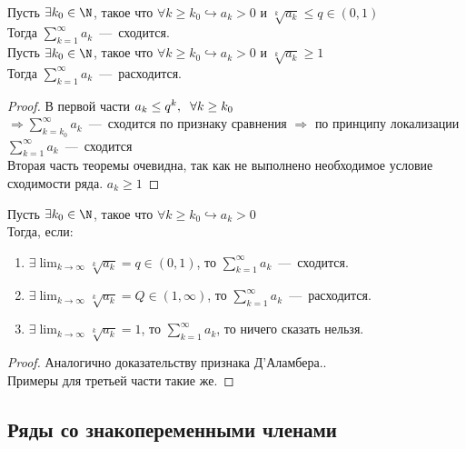 \begin{theorem} 
    \text{}\\ Пусть $\exists k_0 \in \N$, такое что $\forall k \geq k_0 \hookrightarrow a_k > 0 \text{ и } \sqrt[k]{a_k} \leq q \in (0, 1) $\\ 
    Тогда $\sum_{k = 1}^{\infty} a_k$~---~сходится. \\
    Пусть $\exists k_0 \in \N$, такое что $\forall k \geq k_0 \hookrightarrow a_k > 0 \text{ и } \sqrt[k]{a_k} \geq 1 $\\ 
    Тогда $\sum_{k = 1}^{\infty} a_k$~---~расходится.
\end{theorem}
\begin{proof}
    В первой части $a_k \leq q^k, \hspace{0.2cm} \forall k \geq k_0$ \\ $\Rightarrow \sum_{k = k_0}^\infty a_k$~---~сходится по признаку сравнения $\Rightarrow$ по принципу локализации $\sum_{k = 1}^{\infty} a_k$~---~сходится \\ 
    
    Вторая часть теоремы очевидна, так как не выполнено необходимое условие сходимости ряда. $a_k \geq 1$
\end{proof}

\begin{corollary}
    \text{}
    
    Пусть $\exists k_0 \in \N$, такое что $\forall k \geq k_0 \hookrightarrow a_k > 0$ \\ 
    Тогда, если:
    \begin{enumerate}
        \item $\exists \lim_{k\rightarrow \infty}{\sqrt[k]{a_k}} = q \in (0, 1)$, то $\sum_{k = 1}^{\infty} a_k$~---~сходится.
        \item $\exists \lim_{k\rightarrow \infty}{\sqrt[k]{a_k}} = Q \in (1, \infty)$, то $\sum_{k = 1}^{\infty} a_k$~---~расходится.
        \item $\exists \lim_{k\rightarrow \infty}{\sqrt[k]{a_k}} = 1$, то $\sum_{k = 1}^{\infty} a_k$, то ничего сказать нельзя.
    \end{enumerate}
\end{corollary}
\begin{proof}
    Аналогично доказательству признака Д'Аламбера..\\Примеры для третьей части такие же.
\end{proof}

\subsection{Ряды со знакопеременными членами}

